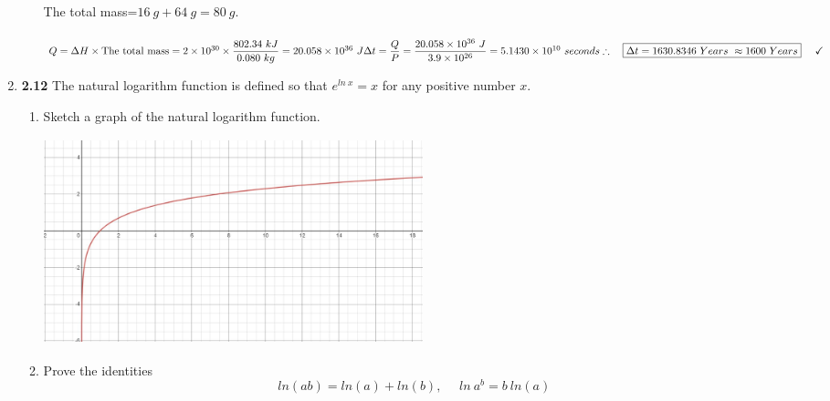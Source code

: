 \documentclass[fleqn]{article}
\begin{document}
\begin{enumerate}
\begin{enumerate}
          \textcolor{hwColor}{
            \\
            The total mass=$16 ~ g+64 ~ g=80 ~ g$.
            \\
            \\
            $
              Q=\Delta H \times \text{The total mass}= 2 \times 10^{30} \times \dfrac{802.34 ~ kJ}{0.080 ~ kg}
              =20.058 \times 10^{36} ~ J
              \\
              \\
              \\
              \Delta t=\dfrac{Q}{P}=\dfrac{20.058 \times 10^{36} ~ J}{3.9 \times 10^{26}}=5.1430 \times 10^{10} ~ seconds
              \\
              \\
              \\
              \therefore ~~~ \boxed{
                \Delta t=1630.8346 ~ Years ~ \approx 1600 ~ Years 
              } ~~~~ \checkmark
              \\
            $
          }

    \end{enumerate}

    \item \textbf{2.12} The natural logarithm function is defined so that $e^{ln ~ x}=x$ for any positive number $x$.
    \begin{enumerate}
      \item Sketch a graph of the natural logarithm function.

      \begin{center}
        \includegraphics[height=6cm, width=11cm]{1.JPG}
      \end{center}

      \pagebreak

      \item Prove the identities
      $$
        ln(ab)=ln(a)+ln(b), ~~~~~~ ln ~ a^b=b ~ ln(a)
      $$


\end{enumerate}
\end{enumerate}
\end{document}
